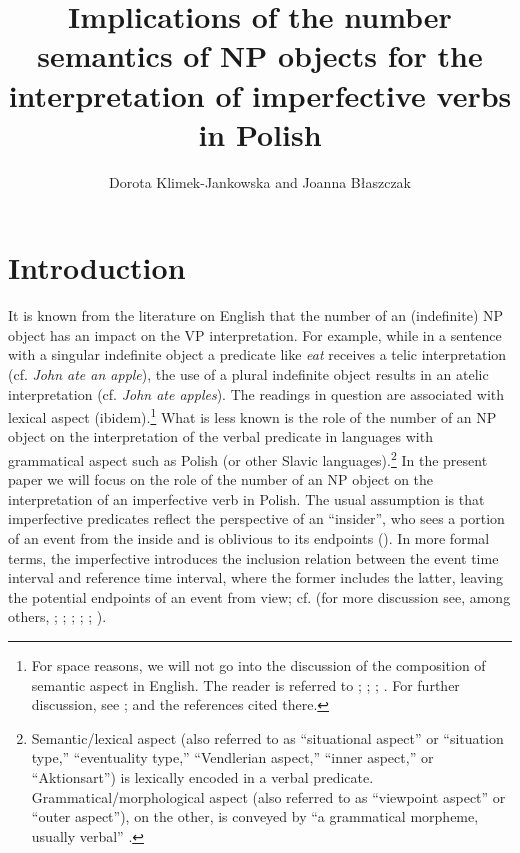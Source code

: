 \documentclass[output=paper]{langscibook}
\author{Dorota Klimek-Jankowska\affiliation{University of Wrocław} and Joanna Błaszczak\affiliation{University of Wrocław}}
\title[Number semantics and the interpretation of imperfective verbs in Polish]{Implications of the number semantics of NP objects for the interpretation of imperfective verbs in Polish}
\begin{document}
\maketitle


\section{Introduction}\label{jan-bla:fansb:kb:sec1}

It is known from the literature on English that the number of an (indefinite) NP object has an impact on the VP interpretation. For example, while in a sentence with a singular indefinite object a predicate like \textit{eat} receives a telic interpretation (cf. \textit{John ate an apple}), the use of a plural indefinite object results in an atelic interpretation (cf. \textit{John ate apples}). The readings in question are associated with lexical aspect (ibidem).\footnote{For space reasons, we will not go into the discussion of the composition of semantic aspect in English. The reader is referred to \citet{Filip1994}; \citet{Krifka1989,Krifka1992,Krifka1998}; \citet{Rothstein2004}; \citet{Verkuyl1972,Verkuyl1993,Verkuyl1999}. For further discussion, see \citet{Dowty1979,MacDonald2008,Tenny1994,Willim2006}; and the references cited there.} What is less known is the role of the number of an NP object on the interpretation of the verbal predicate in languages with grammatical aspect such as Polish (or other Slavic languages).\footnote{Semantic/lexical aspect (also referred to as “situational aspect” or “situation type,” “eventuality type,” “Vendlerian aspect,” “inner aspect,” or “Aktionsart”) is lexically encoded in a verbal predicate. Grammatical/morphological aspect (also referred to as “viewpoint aspect” or “outer aspect”), on the other, is conveyed by “a grammatical morpheme, usually verbal” \citep[2]{Smith1997}.} In the present paper we will focus on the role of the number of an NP object on the interpretation of an imperfective verb in Polish. The usual assumption is that imperfective predicates reflect the perspective of an ``insider'', who sees a portion of an event from the inside and is oblivious to its endpoints (\citealt{KazaninaandPhillips2003}). In more formal terms, the imperfective introduces the inclusion relation between the event time interval and reference time interval, where the former includes the latter, leaving the potential endpoints of an event from view; cf.  (for more discussion see, among others, \citealt{Borik20022006}; \citealt{Comrie1976}; \citealt{KampandReyle1993}; \citealt{Klein1994}; \citealt{Reichenbach1947}; \citealt{Smith1997}).
\end{document}
